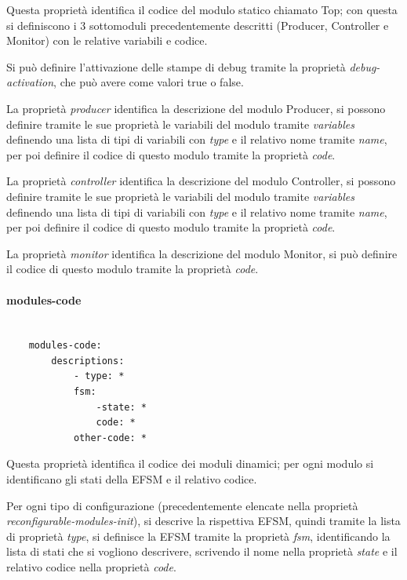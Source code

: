 \documentclass[a4paper,titlepage]{book}
\begin{document}
Questa proprietà identifica il codice del modulo statico chiamato Top; con questa si definiscono i 3 sottomoduli precedentemente descritti (Producer, Controller e Monitor) con le relative variabili e codice.

Si può definire l'attivazione delle stampe di debug tramite la proprietà \textit{debug-activation}, che può avere come valori true o false.

La proprietà \textit{producer} identifica la descrizione del modulo Producer, si possono definire tramite le sue proprietà le variabili del modulo tramite \textit{variables} definendo una lista di tipi di variabili con \textit{type} e il relativo nome tramite \textit{name}, per poi definire il codice di questo modulo tramite la proprietà \textit{code}.

La proprietà \textit{controller} identifica la descrizione del modulo Controller, si possono definire tramite le sue proprietà le variabili del modulo tramite \textit{variables} definendo una lista di tipi di variabili con \textit{type} e il relativo nome tramite \textit{name}, per poi definire il codice di questo modulo tramite la proprietà \textit{code}.

La proprietà \textit{monitor} identifica la descrizione del modulo Monitor, si può definire il codice di questo modulo tramite la proprietà \textit{code}.


\paragraph{modules-code}

\begin{lstlisting}[frame=single]

	modules-code:
		descriptions:
			- type: *
			fsm:
				-state: *
				code: *
			other-code: *

\end{lstlisting}

Questa proprietà identifica il codice dei moduli dinamici; per ogni modulo si identificano gli stati della EFSM e il relativo codice.

Per ogni tipo di configurazione (precedentemente elencate nella proprietà \textit{reconfigurable-modules-init}), si descrive la rispettiva EFSM, quindi tramite la lista di proprietà \textit{type}, si definisce la EFSM tramite la proprietà \textit{fsm}, identificando la lista di stati che si vogliono descrivere, scrivendo il nome nella proprietà \textit{state} e il relativo codice nella proprietà \textit{code}.
\end{document}

